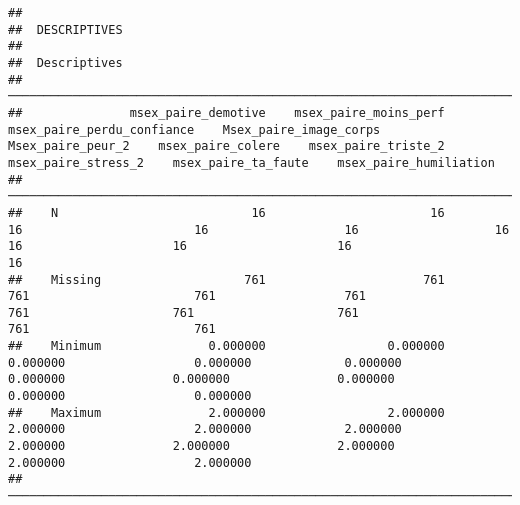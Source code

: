 \documentclass[
]{article}
\begin{document}
\begin{verbatim}
## 
##  DESCRIPTIVES
## 
##  Descriptives                                                                                                                                                                                                                                                 
##  ──────────────────────────────────────────────────────────────────────────────────────────────────────────────────────────────────────────────────────────────────────────────────────────────────────────────────────────────────────────────────────────── 
##               msex_paire_demotive    msex_paire_moins_perf    msex_paire_perdu_confiance    Msex_paire_image_corps    Msex_paire_peur_2    msex_paire_colere    msex_paire_triste_2    msex_paire_stress_2    msex_paire_ta_faute    msex_paire_humiliation   
##  ──────────────────────────────────────────────────────────────────────────────────────────────────────────────────────────────────────────────────────────────────────────────────────────────────────────────────────────────────────────────────────────── 
##    N                           16                       16                            16                        16                   16                   16                     16                     16                     16                        16   
##    Missing                    761                      761                           761                       761                  761                  761                    761                    761                    761                       761   
##    Minimum               0.000000                 0.000000                      0.000000                  0.000000             0.000000             0.000000               0.000000               0.000000               0.000000                  0.000000   
##    Maximum               2.000000                 2.000000                      2.000000                  2.000000             2.000000             2.000000               2.000000               2.000000               2.000000                  2.000000   
##  ────────────────────────────────────────────────────────────────────────────────────────────────────────────────────────────────────────────────────────────────────────────────────────────────────────────────────────────────────────────────────────────
\end{verbatim}
\end{document}
